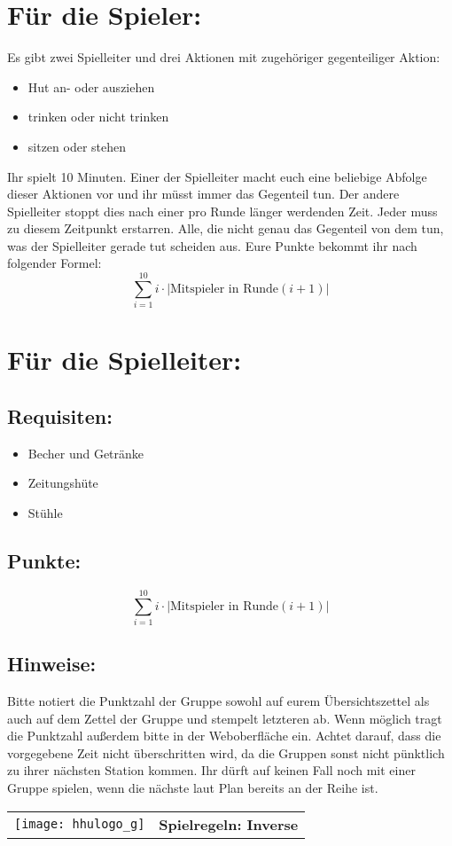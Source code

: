 \documentclass[a4paper,10pt]{article}
\def\spiele{Inverse}
\newcommand{\unten}{
 Bitte notiert die Punktzahl der Gruppe sowohl auf eurem Übersichtszettel als auch auf dem Zettel der Gruppe und stempelt letzteren ab. Wenn möglich tragt die Punktzahl außerdem bitte in der Weboberfläche ein.
 Achtet darauf, dass die vorgegebene Zeit nicht überschritten wird, da die Gruppen sonst nicht pünktlich zu ihrer nächsten Station kommen. Ihr dürft auf keinen Fall noch mit einer Gruppe spielen, wenn die nächste laut Plan bereits an der Reihe ist.
}
\begin{document}
\Large
\section*{Für die Spieler:}
Es gibt zwei Spielleiter und drei Aktionen mit zugehöriger gegenteiliger Aktion: 
\begin{itemize}
 \item Hut an- oder ausziehen
 \item trinken oder nicht trinken
 \item sitzen oder stehen
\end{itemize}
Ihr spielt 10 Minuten. Einer der Spielleiter macht euch eine beliebige Abfolge dieser Aktionen vor und ihr müsst immer das Gegenteil tun. Der andere Spielleiter stoppt dies nach einer pro Runde länger werdenden Zeit. Jeder muss zu diesem Zeitpunkt erstarren. Alle, die nicht genau das Gegenteil von dem tun, was der Spielleiter gerade tut scheiden aus. Eure Punkte bekommt ihr nach folgender Formel:\\
$$\sum\limits_{i=1}^{10}i \cdot |\mbox{Mitspieler in Runde}  (i+1)|$$


\section*{Für die Spielleiter:}
\subsection*{Requisiten:}
\begin{itemize}
 \item Becher und Getränke
 \item Zeitungshüte
 \item Stühle 
\end{itemize}
\subsection*{Punkte:}
$$\sum\limits_{i=1}^{10}i \cdot |\mbox{Mitspieler in Runde} (i+1)|$$

\subsection*{Hinweise:}
\unten

\newpage

  \begin{tabularx}{\textwidth}{lc}
    \texttt{[image: hhulogo\_g]}
  & {\Huge \textbf{Spielregeln: \spiele}}
  \end{tabularx}\\
\end{document}

